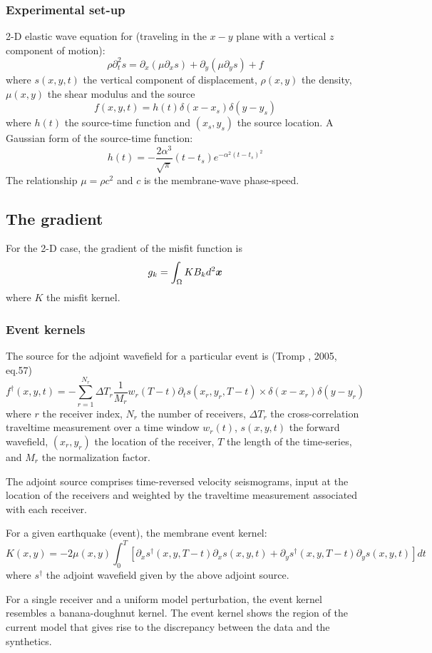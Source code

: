 \subsubsection{Experimental set-up}
2-D elastic wave equation for 
(traveling in the $x-y$ plane with a vertical $z$ component of motion):
\[ \rho\partial^2_ts=\partial_x(\mu\partial_xs)+\partial_y(\mu\partial_ys)+f \]
where $s(x,y,t)$ the vertical component of displacement,
$\rho(x,y)$ the density, $\mu(x,y)$ the shear modulus and the source
\[ f(x,y,t)=h(t)\delta(x-x_s)\delta(y-y_s) \]
where $h(t)$ the source-time function and $(x_s,y_s)$ the source location.
A Gaussian form of the source-time function:
\[ h(t)=-\frac{2\alpha^3}{\sqrt\pi}(t-t_s)e^{-\alpha^2(t-t_s)^2} \]
The relationship $\mu=\rho c^2$ and $c$ is the membrane-wave phase-speed.

\subsection{The gradient}
For the 2-D case, the gradient of the misfit function is
\[ g_k=\int_\Omega KB_kd^2\boldsymbol{x} \]
where $K$ the misfit kernel.

\subsubsection{Event kernels}
The source for the adjoint wavefield for a particular event is (Tromp \etal, 2005, eq.57)
\[ f^\dagger(x,y,t)=-\sum_{r=1}^{N_r}\Delta T_r\frac{1}{M_r}w_r(T-t)\partial_ts(x_r,y_r,T-t)\times\delta(x-x_r)\delta(y-y_r) \]
where $r$ the receiver index, $N_r$ the number of receivers,
$\Delta T_r$ the cross-correlation traveltime measurement over a time window $w_r(t)$,
$s(x,y,t)$ the forward wavefield, $(x_r,y_r)$ the location of the receiver,
$T$ the length of the time-series, and $M_r$ the normalization factor.

The adjoint source comprises time-reversed velocity seismograms,
input at the location of the receivers
and weighted by the traveltime measurement associated with each receiver.

For a given earthquake (event), the membrane event kernel:
\[ K(x,y)=-2\mu(x,y)\int_0^T[\partial_xs^\dagger(x,y,T-t)\partial_xs(x,y,t)+\partial_ys^\dagger(x,y,T-t)\partial_ys(x,y,t)]dt \]
where $s^\dagger$ the adjoint wavefield given by the above adjoint source.

For a single receiver and a uniform model perturbation,
the event kernel resembles a banana-doughnut kernel.
The event kernel shows the region of the current model
that gives rise to the discrepancy between the data and the synthetics.


